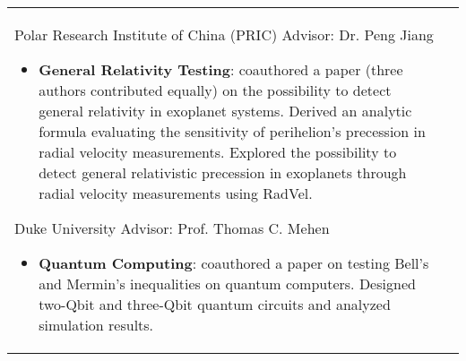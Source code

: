 \documentclass[10pt]{article} %
\begin{document}
\begin{supertabular}{L{4cm}@{\hskip 0.3in}L{13cm}}
{\normalsize Polar Research Institute of China (PRIC)} %
{Advisor: Dr. Peng Jiang} %
{\begin{itemize}
\vspace{-0.4cm}
    \item \textbf{General Relativity Testing}: coauthored a paper (three authors contributed equally) on the possibility to detect general relativity in exoplanet systems. Derived an analytic formula evaluating the sensitivity of perihelion’s precession in radial velocity measurements. Explored the possibility to detect general relativistic precession in exoplanets through radial velocity measurements using RadVel.
\end{itemize}}
 



{\normalsize Duke University} %
{Advisor: Prof. Thomas C. Mehen} %
{\begin{itemize}
\vspace{-0.4cm}
 \item \textbf{Quantum Computing}: coauthored a paper on testing  Bell's and Mermin's inequalities on quantum computers. Designed two-Qbit and three-Qbit quantum circuits and analyzed simulation results.
 \end{itemize}}  %


\end{supertabular}

\vspace*{1mm} %
\end{document}

